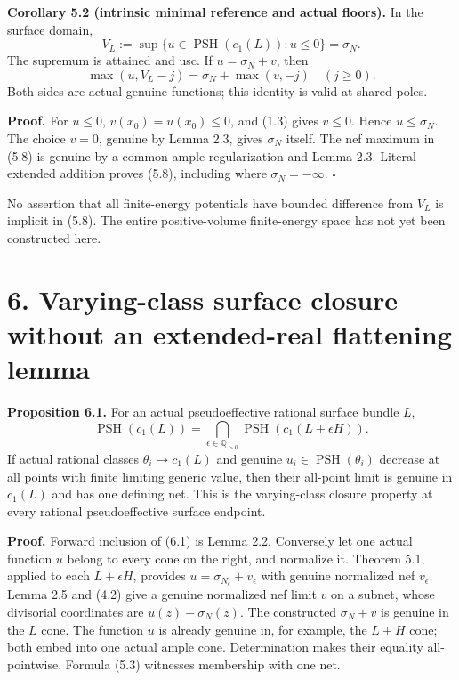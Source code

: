 \documentclass[
  10pt,
]{article}
\begin{document}
\textbf{Corollary 5.2 (intrinsic minimal reference and actual floors).}
In the surface domain, \[
 V_L:=\sup\{u\in\operatorname{PSH}(c_1(L)):u\leq0\}=\sigma_N.
                                                               \tag{5.7}
\] The supremum is attained and usc. If \(u=\sigma_N+v\), then \[
 \max(u,V_L-j)=\sigma_N+\max(v,-j)\quad(j\geq0).                 \tag{5.8}
\] Both sides are actual genuine functions; this identity is valid at
shared poles.

\textbf{Proof.} For \(u\leq0\), \(v(x_0)=u(x_0)\leq0\), and (1.3) gives
\(v\leq0\). Hence \(u\leq\sigma_N\). The choice \(v=0\), genuine by
Lemma 2.3, gives \(\sigma_N\) itself. The nef maximum in (5.8) is
genuine by a common ample regularization and Lemma 2.3. Literal extended
addition proves (5.8), including where \(\sigma_N=-\infty\). \(\square\)

No assertion that all finite-energy potentials have bounded difference
from \(V_L\) is implicit in (5.8). The entire positive-volume
finite-energy space has not yet been constructed here.

\section{6. Varying-class surface closure without an extended-real
flattening
lemma}\label{varying-class-surface-closure-without-an-extended-real-flattening-lemma}

\textbf{Proposition 6.1.} For an actual pseudoeffective rational surface
bundle \(L\), \[
 \operatorname{PSH}(c_1(L))
   =\bigcap_{\epsilon\in\mathbb Q_{>0}}
                      \operatorname{PSH}(c_1(L+\epsilon H)).      \tag{6.1}
\] If actual rational classes \(\theta_i\to c_1(L)\) and genuine
\(u_i\in\operatorname{PSH}(\theta_i)\) decrease at all points with
finite limiting generic value, then their all-point limit is genuine in
\(c_1(L)\) and has one defining net. This is the varying-class closure
property at every rational pseudoeffective surface endpoint.

\textbf{Proof.} Forward inclusion of (6.1) is Lemma 2.2. Conversely let
one actual function \(u\) belong to every cone on the right, and
normalize it. Theorem 5.1, applied to each \(L+\epsilon H\), provides
\(u=\sigma_{N_\epsilon}+v_\epsilon\) with genuine normalized nef
\(v_\epsilon\). Lemma 2.5 and (4.2) give a genuine normalized nef limit
\(v\) on a subnet, whose divisorial coordinates are
\(u(z)-\sigma_N(z)\). The constructed \(\sigma_N+v\) is genuine in the
\(L\) cone. The function \(u\) is already genuine in, for example, the
\(L+H\) cone; both embed into one actual ample cone. Determination makes
their equality all-pointwise. Formula (5.3) witnesses membership with
one net.
\end{document}
